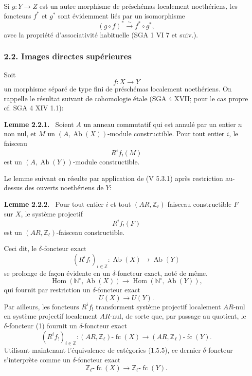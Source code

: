 \documentclass[11pt]{article}
\newenvironment{statement}[1]{\par\medskip\noindent\textbf{#1.}\ }{\par\medskip}
\DeclareMathOperator{\Hom}{Hom}
\providecommand{\Hom}{\operatorname{Hom}}
\providecommand{\Ab}{\operatorname{Ab}}
\providecommand{\fc}{\operatorname{fc}}
\providecommand{\Ab}{\operatorname{Ab}}
\providecommand{\Hom}{\operatorname{Hom}}
\begin{document}
Si \(g:Y\to Z\) est un autre morphisme de préschémas localement noethériens, les foncteurs \(f^*\) et \(g^*\) sont évidemment liés par un isomorphisme
\[
(g\circ f)^*\xrightarrow{\sim}f^*\circ g^*,
\]
avec la propriété d'associativité habituelle (SGA 1 VI 7 et suiv.).

\subsubsection*{2.2. Images directes supérieures}

Soit
\[
f:X\longrightarrow Y
\]
un morphisme séparé de type fini de préschémas localement noethériens. On rappelle le résultat suivant de cohomologie étale (SGA 4 XVII; pour le cas propre cf. SGA 4 XIV 1.1):

\begin{statement}{Lemme 2.2.1}
Soient \(A\) un anneau commutatif qui est annulé par un entier \(n\) non nul, et \(M\) un \((A,\Ab(X))\)-module constructible. Pour tout entier \(i\), le faisceau
\[
R^if_!(M)
\]
est un \((A,\Ab(Y))\)-module constructible.
\end{statement}

Le lemme suivant en résulte par application de (V 5.3.1) après restriction au-dessus des ouverts noethériens de \(Y\):

\begin{statement}{Lemme 2.2.2}
Pour tout entier \(i\) et tout \((AR,\mathbb Z_\ell)\)-faisceau constructible \(F\) sur \(X\), le système projectif
\[
R^if_!(F)
\]
est un \((AR,\mathbb Z_\ell)\)-faisceau constructible.
\end{statement}

Ceci dit, le \(\delta\)-foncteur exact
\[
(R^if_!)_{i\in\mathbb Z}:\Ab(X)\longrightarrow \Ab(Y)
\]
se prolonge de façon évidente en un \(\delta\)-foncteur exact, noté de même,
\[
\Hom(\mathbb N^\circ,\Ab(X))\longrightarrow \Hom(\mathbb N^\circ,\Ab(Y)),
\]
qui fournit par restriction un \(\delta\)-foncteur exact
\[
U(X)\longrightarrow U(Y).
\tag{1}
\]
Par ailleurs, les foncteurs \(R^if_!\) transforment système projectif localement \(AR\)-nul en système projectif localement \(AR\)-nul, de sorte que, par passage au quotient, le \(\delta\)-foncteur (1) fournit un \(\delta\)-foncteur exact
\[
(R^if_!)_{i\in\mathbb Z}:(AR,\mathbb Z_\ell)\text{-}\fc(X)
\longrightarrow (AR,\mathbb Z_\ell)\text{-}\fc(Y).
\]
Utilisant maintenant l'équivalence de catégories (1.5.5), ce dernier \(\delta\)-foncteur s'interprète comme un \(\delta\)-foncteur exact
\[
\mathbb Z_\ell\text{-}\fc(X)\longrightarrow \mathbb Z_\ell\text{-}\fc(Y).
\]
\end{document}
